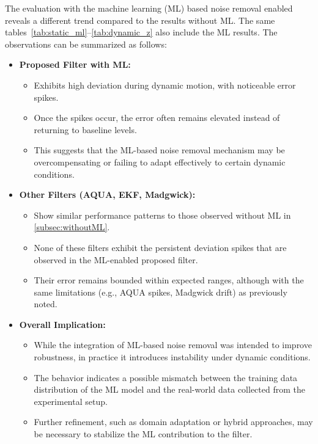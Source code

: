 \documentclass{iutbscthesis}
\begin{document}
The evaluation with the machine learning (ML) based noise removal enabled reveals a different trend compared to the results without ML\@. The same tables~\autoref{tab:static_ml}--\autoref{tab:dynamic_z} also include the ML results. The observations can be summarized as follows:

\begin{itemize}
    \item \textbf{Proposed Filter with ML:}
    \begin{itemize}
        \item Exhibits high deviation during dynamic motion, with noticeable error spikes.
        \item Once the spikes occur, the error often remains elevated instead of returning to baseline levels.
        \item This suggests that the ML-based noise removal mechanism may be overcompensating or failing to adapt effectively to certain dynamic conditions.
    \end{itemize}

    \item \textbf{Other Filters (AQUA, EKF, Madgwick):}
    \begin{itemize}
        \item Show similar performance patterns to those observed without ML in \autoref{subsec:withoutML}.
        \item None of these filters exhibit the persistent deviation spikes that are observed in the ML-enabled proposed filter.
        \item Their error remains bounded within expected ranges, although with the same limitations (e.g., AQUA spikes, Madgwick drift) as previously noted.
    \end{itemize}

    \item \textbf{Overall Implication:}
    \begin{itemize}
        \item While the integration of ML-based noise removal was intended to improve robustness, in practice it introduces instability under dynamic conditions.
        \item The behavior indicates a possible mismatch between the training data distribution of the ML model and the real-world data collected from the experimental setup.
        \item Further refinement, such as domain adaptation or hybrid approaches, may be necessary to stabilize the ML contribution to the filter.
    \end{itemize}
\end{itemize}
\end{document}
